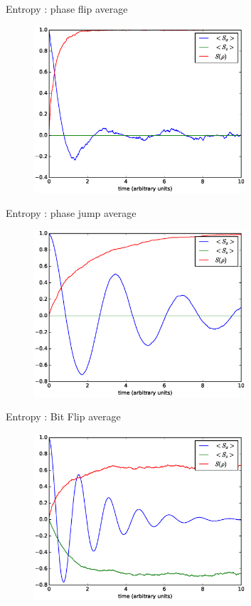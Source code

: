 \documentclass{beamer}
\begin{document}
\begin{frame}{Entropy :  phase flip average}
		\begin{figure}[h]
			\centering
			\includegraphics[width=0.7\textwidth]{figs/phase_flip_1000.eps}
		\end{figure}
\end{frame}
\begin{frame}{Entropy :  phase jump average}
	\begin{figure}[h]
		\centering
		\includegraphics[width=0.7\textwidth]{figs/phase_jump_1000.eps}
	\end{figure}
\end{frame}
\begin{frame}{Entropy :  Bit Flip average}
	\begin{figure}[h]
		\centering
		\includegraphics[width=0.7\textwidth]{figs/unequal_bitflip_1000.eps}
	\end{figure}
\end{frame}
\end{document}

